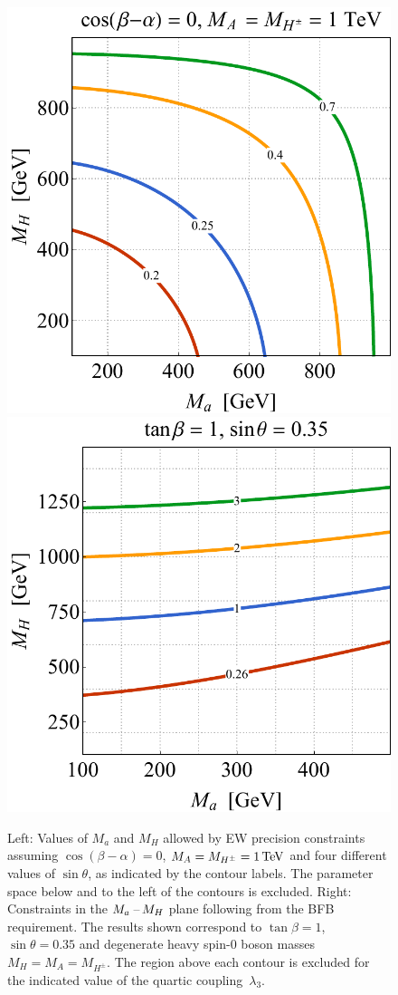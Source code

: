 \documentclass[a4paper, 11pt,notoc]{article}
\begin{document}
\begin{figure}[t!]
\centering
\includegraphics[height=.45\textwidth]{figure4l.pdf} \qquad 
\includegraphics[height=.45\textwidth]{figure4r.pdf}
\vspace{4mm}
\caption{\label{fig:EWVAC} Left: Values of $M_a$ and $M_H$ allowed by EW precision constraints assuming $\cos(\beta-\alpha)=0$, $M_A= M_{H^\pm}=1 \, {\rm TeV}$ and four different values of $\sin \theta$, as indicated by the contour labels.  The parameter space below and to the left of the contours is excluded. Right: Constraints in the $M_{a}\hspace{0.5mm}$--$\hspace{0.5mm} M_H$ plane following from the  BFB requirement. The  results shown correspond to $\tan \beta = 1$, $\sin \theta = 0.35$ and degenerate heavy spin-0 boson masses $M_H = M_A = M_{H^\pm}$. The region above  each contour  is excluded for the indicated value of the quartic coupling~$\lambda_3$.}  
\end{figure}
\end{document}
